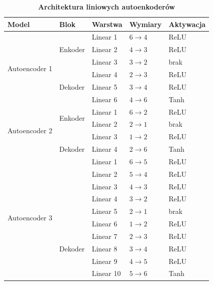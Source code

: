 \begin{table}[H]
\centering
\caption{\textbf{Architektura liniowych autoenkoderów}}
\label{tab:autoencoder_architecture}
\begin{tabular}{lllll}
\toprule
\textbf{Model} & \textbf{Blok} & \textbf{Warstwa} & \textbf{Wymiary} & \textbf{Aktywacja} \\
\midrule
\multirow{6}{*}{Autoencoder 1}
 & \multirow{3}{*}{Enkoder}
 & Linear 1 & $6 \rightarrow 4$ & ReLU \\
 &  & Linear 2 & $4 \rightarrow 3$ & ReLU \\
 &  & Linear 3 & $3 \rightarrow 2$ & brak \\
\cmidrule(lr){2-5}
 & \multirow{3}{*}{Dekoder}
 & Linear 4 & $2 \rightarrow 3$ & ReLU \\
 &  & Linear 5 & $3 \rightarrow 4$ & ReLU \\
 &  & Linear 6 & $4 \rightarrow 6$ & Tanh \\

 \midrule
\multirow{4}{*}{Autoencoder 2}
 & \multirow{2}{*}{Enkoder}
 & Linear 1 & $6 \rightarrow 2$ & ReLU \\
 &  & Linear 2 & $2 \rightarrow 1$ & brak \\
 
\cmidrule(lr){2-5}
 & \multirow{3}{*}{Dekoder}
 & Linear 3 & $1 \rightarrow 2$ & ReLU \\
 &  & Linear 4 & $2 \rightarrow 6$ & Tanh \\

 \midrule
\multirow{10}{*}{Autoencoder 3}
 & \multirow{5}{*}{Enkoder}
 & Linear 1 & $6 \rightarrow 5$ & ReLU \\
 &  & Linear 2 & $5 \rightarrow 4$ & ReLU \\
 &  & Linear 3 & $4 \rightarrow 3$ & ReLU \\
 &  & Linear 4 & $3 \rightarrow 2$ & ReLU \\
 &  & Linear 5 & $2 \rightarrow 1$ & brak \\
\cmidrule(lr){2-5}
 & \multirow{5}{*}{Dekoder}
 & Linear 6 & $1 \rightarrow 2$ & ReLU \\
 &  & Linear 7 & $2 \rightarrow 3$ & ReLU \\
 &  & Linear 8 & $3 \rightarrow 4$ & ReLU \\
 &  & Linear 9 & $4 \rightarrow 5$ & ReLU \\
 &  & Linear 10 & $5 \rightarrow 6$ & Tanh \\
\bottomrule
\end{tabular}
\end{table}

